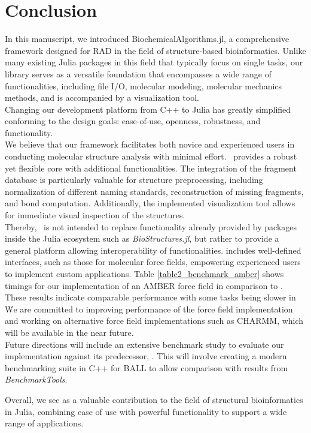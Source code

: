 

\section{Conclusion}

In this manuscript, we introduced BiochemicalAlgorithms.jl, a comprehensive framework designed for RAD in the field of structure-based bioinformatics. Unlike many existing Julia packages in this field that typically focus on single tasks, our library serves as a versatile foundation that encompasses a wide range of functionalities, including file I/O, molecular modeling, molecular mechanics methods, and is accompanied by a visualization tool.\\
Changing our development platform from C++ to Julia has greatly simplified conforming to the design goals: ease-of-use, openness, robustness, and functionality. \\

We believe that our framework facilitates both novice and experienced users in conducting molecular structure analysis with minimal effort. \biochem\ provides a robust yet flexible core with additional functionalities. The integration of the fragment database is particularly valuable for structure preprocessing, including normalization of different naming standards, reconstruction of missing fragments, and bond computation. Additionally, the implemented visualization tool allows for immediate visual inspection of the structures. \\
Thereby, \biochem\ is not intended to replace functionality already provided by packages inside the Julia ecosystem such as \textit{BioStructures.jl}, but rather to provide a general platform allowing interoperability of functionalities. 
\biochem includes well-defined interfaces, such as those for molecular force fields, empowering experienced users to implement custom applications.  Table \ref{table2_benchmark_amber} shows timings for our implementation of an AMBER force field in comparison to \ball. These results indicate comparable performance with some tasks being slower in \biochem\. We are committed to improving performance of the force field implementation and working on alternative force field implementations such as CHARMM, which will be available in the near future. \\

Future directions will include an extensive benchmark study to evaluate our implementation against its predecessor, \ball. This will involve creating a modern benchmarking suite in C++ for BALL to allow comparison with results from \textit{BenchmarkTools}.

Overall, we see \biochem as a valuable contribution to the field of structural bioinformatics in Julia, combining ease of use with powerful functionality to support a wide range of applications.
